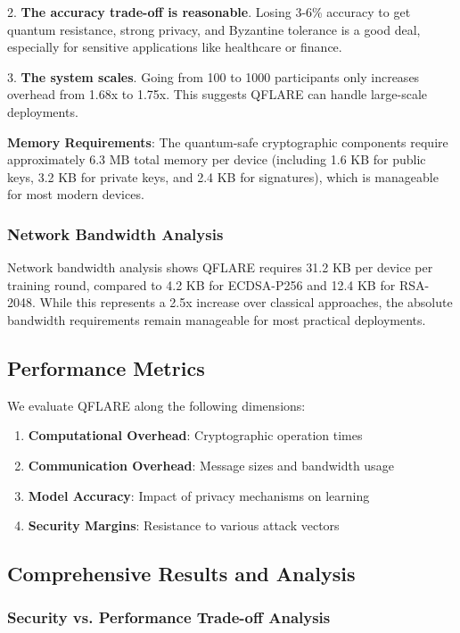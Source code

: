 \documentclass[journal]{IEEEtran}
\begin{document}
2. \textbf{The accuracy trade-off is reasonable}. Losing 3-6\% accuracy to get quantum resistance, strong privacy, and Byzantine tolerance is a good deal, especially for sensitive applications like healthcare or finance.

3. \textbf{The system scales}. Going from 100 to 1000 participants only increases overhead from 1.68x to 1.75x. This suggests QFLARE can handle large-scale deployments.

\textbf{Memory Requirements}: The quantum-safe cryptographic components require approximately 6.3 MB total memory per device (including 1.6 KB for public keys, 3.2 KB for private keys, and 2.4 KB for signatures), which is manageable for most modern devices.

\subsubsection{Network Bandwidth Analysis}

Network bandwidth analysis shows QFLARE requires 31.2 KB per device per training round, compared to 4.2 KB for ECDSA-P256 and 12.4 KB for RSA-2048. While this represents a 2.5x increase over classical approaches, the absolute bandwidth requirements remain manageable for most practical deployments.

\subsection{Performance Metrics}

We evaluate QFLARE along the following dimensions:

\begin{enumerate}
\item \textbf{Computational Overhead}: Cryptographic operation times
\item \textbf{Communication Overhead}: Message sizes and bandwidth usage
\item \textbf{Model Accuracy}: Impact of privacy mechanisms on learning
\item \textbf{Security Margins}: Resistance to various attack vectors
\end{enumerate}

\subsection{Comprehensive Results and Analysis}

\subsubsection{Security vs. Performance Trade-off Analysis}
\end{document}

